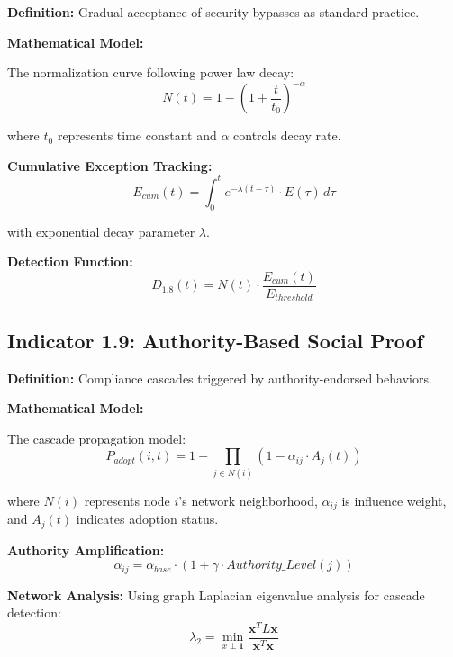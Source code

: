 \documentclass[11pt,a4paper]{article}
\begin{document}
\textbf{Definition:} Gradual acceptance of security bypasses as standard practice.

\textbf{Mathematical Model:}

The normalization curve following power law decay:
\begin{equation}
N(t) = 1 - \left(1 + \frac{t}{t_0}\right)^{-\alpha}
\end{equation}

where $t_0$ represents time constant and $\alpha$ controls decay rate.

\textbf{Cumulative Exception Tracking:}
\begin{equation}
E_{cum}(t) = \int_0^t e^{-\lambda(t-\tau)} \cdot E(\tau) \, d\tau
\end{equation}

with exponential decay parameter $\lambda$.

\textbf{Detection Function:}
\begin{equation}
D_{1.8}(t) = N(t) \cdot \frac{E_{cum}(t)}{E_{threshold}}
\end{equation}

\subsection{Indicator 1.9: Authority-Based Social Proof}

\textbf{Definition:} Compliance cascades triggered by authority-endorsed behaviors.

\textbf{Mathematical Model:}

The cascade propagation model:
\begin{equation}
P_{adopt}(i,t) = 1 - \prod_{j \in N(i)} (1 - \alpha_{ij} \cdot A_j(t))
\end{equation}

where $N(i)$ represents node $i$'s network neighborhood, $\alpha_{ij}$ is influence weight, and $A_j(t)$ indicates adoption status.

\textbf{Authority Amplification:}
\begin{equation}
\alpha_{ij} = \alpha_{base} \cdot (1 + \gamma \cdot Authority\_Level(j))
\end{equation}

\textbf{Network Analysis:}
Using graph Laplacian eigenvalue analysis for cascade detection:
\begin{equation}
\lambda_2 = \min_{x \perp \mathbf{1}} \frac{\mathbf{x}^T L \mathbf{x}}{\mathbf{x}^T \mathbf{x}}
\end{equation}
\end{document}
